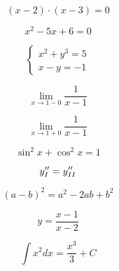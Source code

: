 \documentclass{article}
\begin{document}
\begin{equation}
    (x - 2) \cdot (x - 3) = 0
\end{equation}

\begin{equation}
    x^2 - 5x + 6 = 0
\end{equation}

\begin{equation}
    \begin{cases}
        x^2 + y^3 = 5 \\
        x - y = -1
    \end{cases}
\end{equation}

\begin{equation}
    \lim_{x\to1-0} \frac{1}{x-1}
\end{equation}

\begin{equation}
    \lim_{x\to1+0} \frac{1}{x-1}
\end{equation}

\begin{equation}
    \sin^2x + \cos^2x = 1
\end{equation}

\begin{equation}
    y^{\prime\prime}_{\MakeUppercase{\romannumeral 1}}
    =
    y^{\prime\prime}_{\MakeUppercase{\romannumeral 2}}
\end{equation}

\begin{equation}
    (a - b)^2 = a^2 - 2ab + b^2
\end{equation}

\begin{equation}
    y=\frac{x-1}{x-2}
\end{equation}

\begin{equation}
    \int x^2dx = \frac{x^3}{3} + C
\end{equation}
\end{document}
